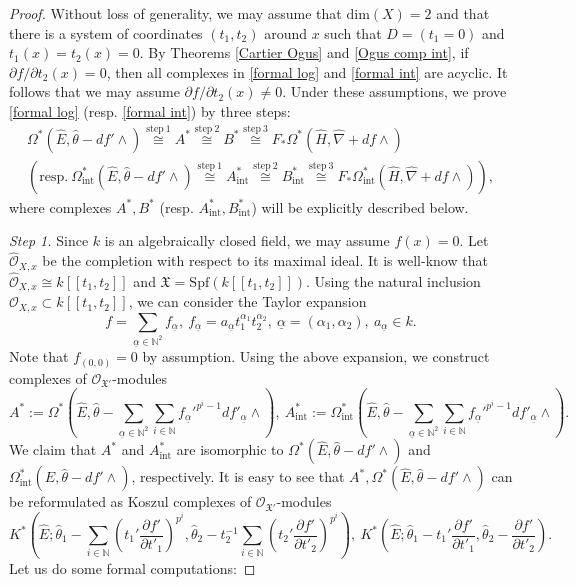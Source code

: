 \documentclass[12pt, a4paper]{article}
\begin{document}
\begin{proof}
 Without loss of generality, we may assume that $\mathrm{dim}(X)=2$ and that there is a system of coordinates $(t_1,t_2)$ around $x$ such that $D=(t_1=0)$ and $t_1(x)=t_2(x)=0$. By Theorems \ref{Cartier Ogus} and \ref{Ogus comp int}, if $\partial f/\partial t_2(x)=0$, then all complexes in \eqref{formal log} and \eqref{formal int} are acyclic. It follows that we may assume $\partial f/\partial t_2(x)\neq0$.
Under these assumptions, we prove \eqref{formal log} (resp. \eqref{formal int}) by three steps:
$$
\begin{array}{c}
\Omega^*(\hat E,\hat\theta-df'\wedge)\stackrel{\mathrm{step}~1}{\cong}A^*\stackrel{\mathrm{step}~2}{\cong}B^*\stackrel{\mathrm{step}~3}{\cong}F_*\Omega^*(\hat H,\hat\nabla+df\wedge)\\
(\mathrm{resp.}~\Omega_\mathrm{int}^*(\hat E,\hat\theta-df'\wedge)\stackrel{\mathrm{step}~1}{\cong}A_\mathrm{int}^*\stackrel{\mathrm{step}~2}{\cong}B_\mathrm{int}^*\stackrel{\mathrm{step}~3}{\cong}F_*\Omega_\mathrm{int}^*(\hat H,\hat\nabla+df\wedge)),
\end{array}
$$
where complexes $A^*,B^*$ (resp. $A^*_\mathrm{int},B^*_\mathrm{int}$) will be explicitly described below. 

{\itshape Step 1.} Since $k$ is an algebraically closed field, we may assume $f(x)=0$. Let $\hat{\mathcal O}_{X,x}$ be the completion with respect to its maximal ideal. It is well-know that $\hat{\mathcal O}_{X,x}\cong k[[t_1,t_2]]$ and $\mathfrak X=\mathrm{Spf}(k[[t_1,t_2]])$. Using the natural inclusion $\mathcal O_{X,x}\subset k[[t_1,t_2]]$, we can consider the Taylor expansion 
$$f=\sum_{\underline\alpha\in\mathbb N^2}f_{\underline\alpha},~f_{\underline\alpha}=a_{\underline\alpha}t_1^{\alpha_1}t_2^{\alpha_2},~\underline\alpha=(\alpha_1,\alpha_2),~a_{\underline\alpha}\in k.$$
Note that $f_{(0,0)}=0$ by assumption. Using the above expansion, we construct complexes of $\mathcal O_{\mathfrak X'}$-modules
$$
A^*:=\Omega^*(\hat E,\hat\theta-\sum_{\underline\alpha\in\mathbb N^2}\sum_{i\in\mathbb N} f_{\underline\alpha}'^{p^i-1}df'_{\underline\alpha}\wedge),~A_\mathrm{int}^*:=\Omega^*_\mathrm{int}(\hat E,\hat\theta-\sum_{\underline\alpha\in\mathbb N^2}\sum_{i\in\mathbb N} f_{\underline\alpha}'^{p^i-1}df'_{\underline\alpha}\wedge).
$$
We claim that $A^*$ and $A^*_\mathrm{int}$ are isomorphic to $\Omega^*(\hat E,\hat\theta-df'\wedge)$ and $\Omega_\mathrm{int}^*(\hat E,\hat\theta-df'\wedge)$, respectively. It is easy to see that $A^*,\Omega^*(\hat E,\hat\theta-df'\wedge)$
can be reformulated as Koszul complexes of $\mathcal O_{\mathfrak X'}$-modules
$$
K^*(\hat E;\hat\theta_1-\sum_{i\in\mathbb N}(t_1'\frac{\partial f'}{\partial t'_1})^{p^i},\hat\theta_2-t_2^{-1}\sum_{i\in\mathbb N}(t_2'\frac{\partial f'}{\partial t'_2})^{p^i})
,~K^*(\hat E;\hat\theta_1-t_1'\frac{\partial f'}{\partial t'_1},\hat\theta_2-\frac{\partial f'}{\partial t'_2}).$$
Let us do some formal computations:


\end{proof}
\end{document}
